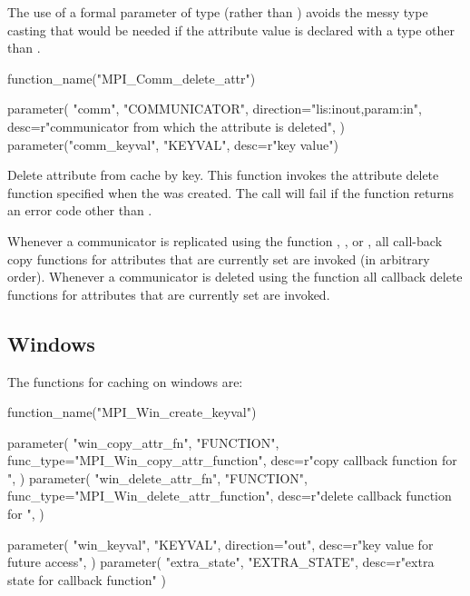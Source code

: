\begin{rationale}
The use of a formal parameter 
of type
 (rather than ) avoids the messy type
casting that would be needed if the attribute value is declared with a
type other than .
\end{rationale}

%
\begin{mpi-binding}
    function_name("MPI_Comm_delete_attr")
    
    parameter(
        "comm",
        "COMMUNICATOR",
        direction="lis:inout,param:in",
        desc=r"communicator from which the attribute is deleted",
    )
    parameter("comm_keyval", "KEYVAL", desc=r"key value")
\end{mpi-binding}

Delete attribute from cache by key. This function invokes the
attribute delete function 
specified when the  was created.
The call will fail if the  function returns an
error code other than .

Whenever a communicator is replicated using the function
, ,
 or ,
all call-back copy functions for attributes
that are currently set are invoked (in arbitrary order).
Whenever a communicator is deleted using the function
 all callback delete functions for attributes
that are currently set are invoked.

\subsection{Windows}
\label{sec:ei-attr:windows}

The functions for caching on windows are:

\begin{mpi-binding}
    function_name("MPI_Win_create_keyval")
    
    parameter(
        "win_copy_attr_fn",
        "FUNCTION",
        func_type="MPI_Win_copy_attr_function",
        desc=r"copy callback function for ",
    )
    parameter(
        "win_delete_attr_fn",
        "FUNCTION",
        func_type="MPI_Win_delete_attr_function",
        desc=r"delete callback function for ",
    )
    
    parameter(
        "win_keyval",
        "KEYVAL",
        direction="out",
        desc=r"key value for future access",
    )
    parameter(
        "extra_state", "EXTRA_STATE", desc=r"extra state for callback function"
    )
\end{mpi-binding}

